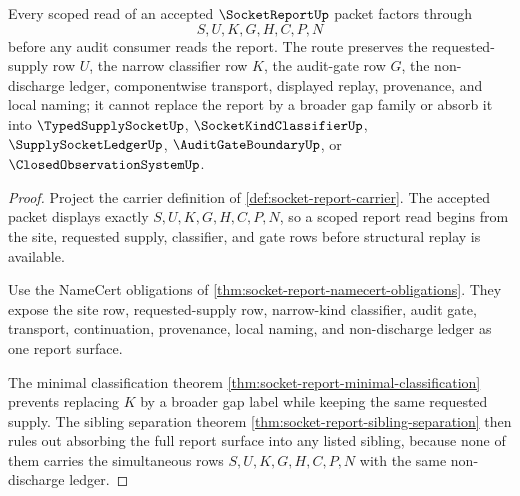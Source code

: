 \begin{theorem}
\label{thm:socket-report-scoped-report-route}
Every scoped read of an accepted $\SocketReportUp$ packet factors through
$$
S,U,K,G,H,C,P,N
$$
before any audit consumer reads the report. The route preserves the requested-supply row $U$, the narrow classifier row $K$, the audit-gate row $G$, the non-discharge ledger, componentwise transport, displayed replay, provenance, and local naming; it cannot replace the report by a broader gap family or absorb it into $\TypedSupplySocketUp$, $\SocketKindClassifierUp$, $\SupplySocketLedgerUp$, $\AuditGateBoundaryUp$, or $\ClosedObservationSystemUp$.
\end{theorem}
\begin{proof}
Project the carrier definition of \autoref{def:socket-report-carrier}. The accepted packet displays exactly $S,U,K,G,H,C,P,N$, so a scoped report read begins from the site, requested supply, classifier, and gate rows before structural replay is available.

Use the NameCert obligations of \autoref{thm:socket-report-namecert-obligations}. They expose the site row, requested-supply row, narrow-kind classifier, audit gate, transport, continuation, provenance, local naming, and non-discharge ledger as one report surface.

The minimal classification theorem \autoref{thm:socket-report-minimal-classification} prevents replacing $K$ by a broader gap label while keeping the same requested supply. The sibling separation theorem \autoref{thm:socket-report-sibling-separation} then rules out absorbing the full report surface into any listed sibling, because none of them carries the simultaneous rows $S,U,K,G,H,C,P,N$ with the same non-discharge ledger.
\end{proof}

